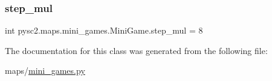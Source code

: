 \subsubsection{\texorpdfstring{step\+\_\+mul}{step\_mul}}
{\footnotesize\ttfamily int pysc2.\+maps.\+mini\+\_\+games.\+Mini\+Game.\+step\+\_\+mul = 8\hspace{0.3cm}{\ttfamily [static]}}



The documentation for this class was generated from the following file\+:\begin{DoxyCompactItemize}
\item 
maps/\mbox{\hyperlink{mini__games_8py}{mini\+\_\+games.\+py}}\end{DoxyCompactItemize}
